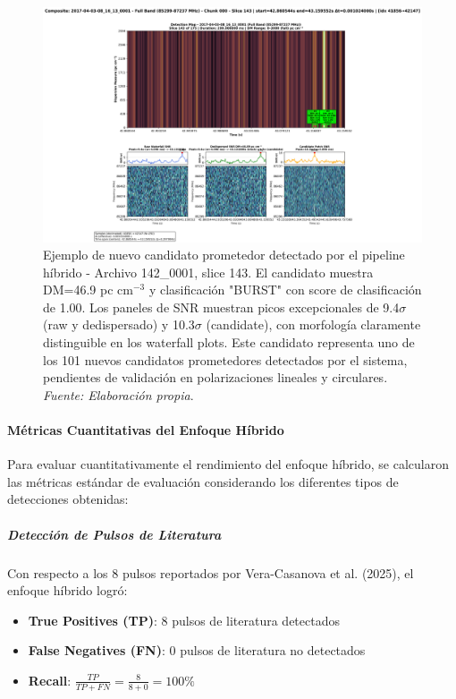 \begin{figure}[H]
    \centering
    \includegraphics[width=\textwidth]{figures/DRAFTS-HF-SNR/2017-04-03-08_16_13_0001_slice143.png}
    \caption[Nuevo candidato prometedor: Archivo 142\_0001, Tiempo 43.136s]{Ejemplo de nuevo candidato prometedor detectado por el pipeline híbrido - Archivo 142\_0001, slice 143. El candidato muestra DM=46.9 pc cm$^{-3}$ y clasificación "BURST" con score de clasificación de 1.00. Los paneles de SNR muestran picos excepcionales de 9.4$\sigma$ (raw y dedispersado) y 10.3$\sigma$ (candidate), con morfología claramente distinguible en los waterfall plots. Este candidato representa uno de los 101 nuevos candidatos prometedores detectados por el sistema, pendientes de validación en polarizaciones lineales y circulares. \textit{Fuente: Elaboración propia}.}
    \label{fig:alma_new_candidate_validation}
\end{figure}

\paragraph{Métricas Cuantitativas del Enfoque Híbrido}

Para evaluar cuantitativamente el rendimiento del enfoque híbrido, se calcularon las métricas estándar de evaluación considerando los diferentes tipos de detecciones obtenidas:

\subparagraph{Detección de Pulsos de Literatura}

Con respecto a los 8 pulsos reportados por Vera-Casanova et al. (2025), el enfoque híbrido logró:

\begin{itemize}
    \item \textbf{True Positives (TP)}: 8 pulsos de literatura detectados
    \item \textbf{False Negatives (FN)}: 0 pulsos de literatura no detectados
    \item \textbf{Recall}: $\frac{TP}{TP + FN} = \frac{8}{8 + 0} = 100\%$
\end{itemize}


